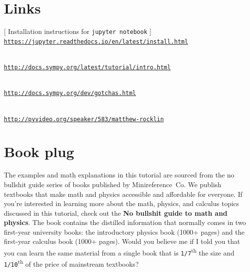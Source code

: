 \documentclass[9pt, onecolumn]{IEEEtran}
\begin{document}
\section*{Links}
\label{sec:links}

[ Installation instructions for \texttt{jupyter notebook} ] \\ 
\href{https://jupyter.readthedocs.io/en/latest/install.html}{\texttt{https://jupyter.readthedocs.io/en/latest/install.html}}

 \\ 
\href{http://docs.sympy.org/latest/tutorial/intro.html}{\texttt{http://docs.sympy.org/latest/tutorial/intro.html}}

 \\ 
\href{http://docs.sympy.org/dev/gotchas.html}{\texttt{http://docs.sympy.org/dev/gotchas.html}}

 \\
\href{http://pyvideo.org/speaker/583/matthew-rocklin}{\texttt{http://pyvideo.org/speaker/583/matthew-rocklin}}





\section*{Book plug}
\label{sec:book_plug}


The examples and math explanations in this tutorial are sourced from the 
{\sc no bullshit guide} series of books published by Minireference~Co.
We publish textbooks that make math and physics accessible and affordable for everyone.
If you're interested in %
learning more about the math, physics, and calculus topics discussed in this tutorial,
check out the \textbf{No bullshit guide to math and physics}.
The book contains the distilled information that normally comes in two first-year university books:
the introductory physics book (1000+ pages) and the first-year calculus book (1000+ pages).
Would you believe me if I told you that you can learn the 
same material from a single book that is \texttt{1/7}\textsuperscript{th} the size and \texttt{1/10}\textsuperscript{th} of the 
price of mainstream textbooks?
\end{document}
